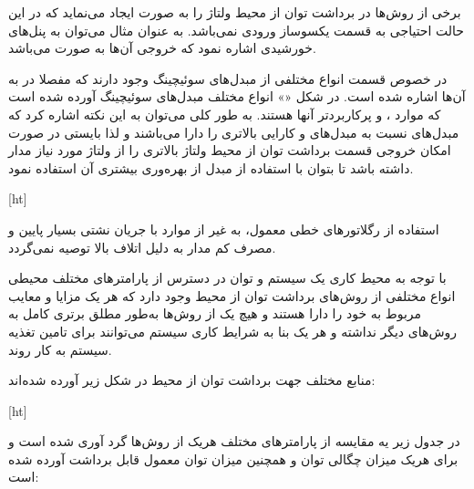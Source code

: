 برخی از روش‌ها در برداشت توان از محیط ولتاژ را به صورت  ایجاد می‌نماید که در این حالت احتیاجی به قسمت یکسوساز ورودی نمی‌باشد. به عنوان مثال می‌توان به پنل‌های خورشیدی اشاره نمود که خروجی آن‌ها به صورت  می‌باشد.


در خصوص قسمت  انواع مختلفی از مبدل‌های سوئیچینگ وجود دارند که مفصلا در  به آن‌ها اشاره شده است. در شکل «» انواع مختلف مبدل‌های سوئیچینگ آورده شده است که موارد ،  و  پرکاربردتر آنها هستند. به طور کلی می‌توان به این نکته اشاره کرد که مبدل‌های  نسبت به مبدل‌های  و  کارایی بالاتری را دارا می‌باشند و لذا بایستی در صورت امکان خروجی قسمت برداشت توان از محیط ولتاژ بالاتری را از ولتاژ مورد نیاز مدار داشته باشد تا بتوان با استفاده از مبدل  از بهره‌وری بیشتری آن استفاده نمود.


[ht]


استفاده از رگلاتورهای خطی معمول، به غیر از موارد با جریان نشتی بسیار پایین و مصرف کم مدار به دلیل اتلاف بالا توصیه نمی‌گردد.




با توجه به محیط کاری یک سیستم و توان در دسترس از پارامترهای مختلف محیطی انواع مختلفی از روش‌های برداشت توان از محیط وجود دارد که هر یک مزایا و معایب مربوط به خود را دارا هستند و هیچ یک از روش‌ها به‌طور مطلق برتری کامل به روش‌های دیگر نداشته و هر یک بنا به شرایط کاری سیستم می‌توانند برای تامین تغذیه سیستم به کار روند.

منابع مختلف جهت برداشت توان از محیط در شکل زیر آورده شده‌اند:

[ht]

در جدول زیر یه مقایسه از پارامتر‌های مختلف هریک از روش‌ها گرد آوری شده است و برای هریک میزان چگالی توان و همچنین میزان توان معمول قابل برداشت آورده شده است:




